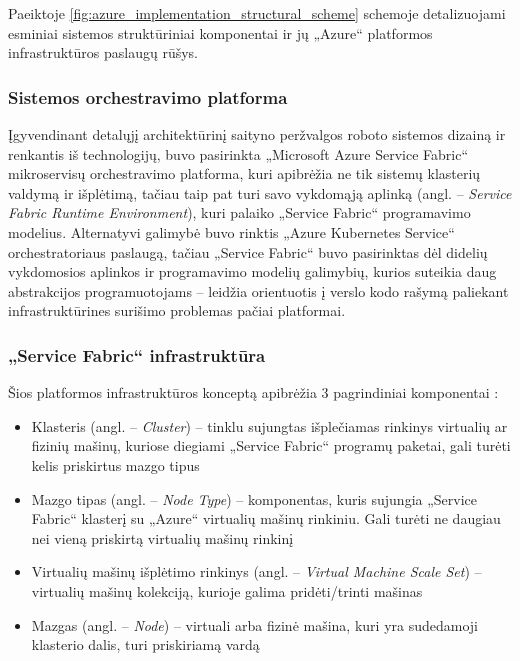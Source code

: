 \pagebreak

Paeiktoje \ref{fig:azure_implementation_structural_scheme} schemoje detalizuojami esminiai sistemos struktūriniai komponentai ir jų „Azure“ platformos infrastruktūros paslaugų rūšys. 


\subsubsection{Sistemos orchestravimo platforma}

Įgyvendinant detalųjį architektūrinį saityno peržvalgos roboto sistemos dizainą ir renkantis iš technologijų, buvo pasirinkta „Microsoft Azure Service Fabric“ mikroservisų orchestravimo platforma, kuri apibrėžia ne tik sistemų klasterių valdymą ir išplėtimą, tačiau taip pat turi savo vykdomąją aplinką (angl. -- \textit{Service Fabric Runtime Environment}), kuri palaiko „Service Fabric“ programavimo modelius. Alternatyvi galimybė buvo rinktis „Azure Kubernetes Service“ orchestratoriaus paslaugą, tačiau „Service Fabric“ buvo pasirinktas dėl didelių vykdomosios aplinkos ir programavimo modelių galimybių, kurios suteikia daug abstrakcijos programuotojams -- leidžia orientuotis į verslo kodo rašymą paliekant infrastruktūrines surišimo problemas pačiai platformai.

\subsubsection{„Service Fabric“ infrastruktūra}

Šios platformos infrastruktūros konceptą apibrėžia 3 pagrindiniai komponentai \cite{ServiceFabricTerminology}:
\begin{itemize}
    \item Klasteris (angl. -- \textit{Cluster}) -- tinklu sujungtas išplečiamas rinkinys virtualių ar fizinių mašinų, kuriose diegiami „Service Fabric“ programų paketai, gali turėti kelis priskirtus mazgo tipus
    \item Mazgo tipas (angl. -- \textit{Node Type}) -- komponentas, kuris sujungia „Service Fabric“ klasterį su „Azure“ virtualių mašinų rinkiniu. Gali turėti ne daugiau nei vieną priskirtą virtualių mašinų rinkinį
    \item Virtualių mašinų išplėtimo rinkinys (angl. -- \textit{Virtual Machine Scale Set}) -- virtualių mašinų kolekciją, kurioje galima pridėti/trinti mašinas
    \item Mazgas (angl. -- \textit{Node}) -- virtuali arba fizinė mašina, kuri yra sudedamoji klasterio dalis, turi priskiriamą vardą
\end{itemize}

